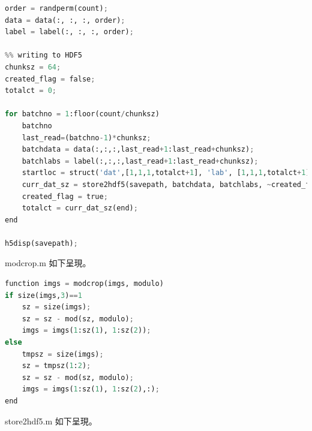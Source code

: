 \documentclass[11pt,UTF8]{ctexart}
\begin{document}
\begin{lstlisting}[language={python}]
order = randperm(count);
data = data(:, :, :, order);
label = label(:, :, :, order); 

%% writing to HDF5
chunksz = 64;
created_flag = false;
totalct = 0;

for batchno = 1:floor(count/chunksz)
    batchno
    last_read=(batchno-1)*chunksz;
    batchdata = data(:,:,:,last_read+1:last_read+chunksz); 
    batchlabs = label(:,:,:,last_read+1:last_read+chunksz);
    startloc = struct('dat',[1,1,1,totalct+1], 'lab', [1,1,1,totalct+1]);
    curr_dat_sz = store2hdf5(savepath, batchdata, batchlabs, ~created_flag, startloc, chunksz); 
    created_flag = true;
    totalct = curr_dat_sz(end);
end

h5disp(savepath);
	\end{lstlisting}
	
modcrop.m 如下呈現。

	\begin{lstlisting}[language={python}]
function imgs = modcrop(imgs, modulo)
if size(imgs,3)==1
    sz = size(imgs);
    sz = sz - mod(sz, modulo);
    imgs = imgs(1:sz(1), 1:sz(2));
else
    tmpsz = size(imgs);
    sz = tmpsz(1:2);
    sz = sz - mod(sz, modulo);
    imgs = imgs(1:sz(1), 1:sz(2),:);
end
	\end{lstlisting}

store2hdf5.m 如下呈現。
\end{document}
